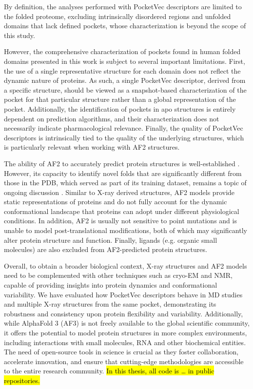 By definition, the analyses performed with PocketVec descriptors are limited to the folded proteome, excluding intrinsically disordered regions and unfolded domains that lack defined pockets, whose characterization is beyond the scope of this study. 


However, the comprehensive characterization of pockets found in human folded domains presented in this work is subject to several important limitations. First, the use of a single representative structure for each domain does not reflect the dynamic nature of proteins. As such, a single PocketVec descriptor, derived from a specific structure, should be viewed as a snapshot-based characterization of the pocket for that particular structure rather than a global representation of the pocket. Additionally, the identification of pockets in apo structures is entirely dependent on prediction algorithms, and their characterization does not necessarily indicate pharmacological relevance. Finally, the quality of PocketVec descriptors is intrinsically tied to the quality of the underlying structures, which is particularly relevant when working with AF2 structures.

The ability of AF2 to accurately predict protein structures is well-established \cite{jumper_highly_2021, tunyasuvunakool_highly_2021}. However, its capacity to identify novel folds that are significantly different from those in the PDB, which served as part of its training dataset, remains a topic of ongoing discussion \cite{akdel_structural_2022}. Similar to X-ray derived structures, AF2 models provide static representations of proteins and do not fully account for the dynamic conformational landscape that proteins can adopt under different physiological conditions. In addition, AF2 is usually not sensitive to point mutations and is unable to model post-translational modifications, both of which may significantly alter protein structure and function. Finally, ligands (e.g. organic small molecules) are also excluded from AF2-predicted protein structures.

Overall, to obtain a broader biological context, X-ray structures and AF2 models need to be complemented with other techniques such as cryo-EM and NMR, capable of providing insights into protein dynamics and conformational variability. We have evaluated how PocketVec descriptors behave in MD studies and multiple X-ray structures from the same pocket, demonstrating its robustness and consistency upon protein flexibility and variability. Additionally, while AlphaFold 3 (AF3) is not freely available to the global scientific community, it offers the potential to model protein structures in more complex environments, including interactions with small molecules, RNA and other biochemical entities\cite{abramson_accurate_2024}. The need of open-source tools in science is crucial as they foster collaboration, accelerate innovation, and ensure that cutting-edge methodologies are accessible to the entire research community. \hl{In this thesis, all code is … in public repositories. }

